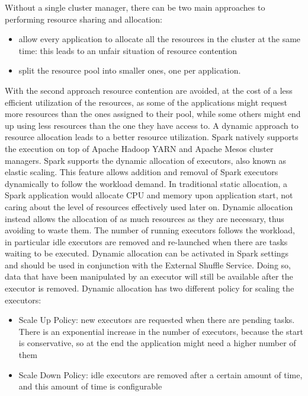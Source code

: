 Without a single cluster manager, there can be two main approaches to performing resource sharing and allocation:
\begin{itemize}
	\item  allow every application to allocate all the resources in the cluster at the same time: this leads to an unfair situation of resource contention
	\item split the resource pool into smaller ones, one per application.
\end{itemize}
With the second approach resource contention are avoided, at the cost of a less efficient utilization of the resources, as some of the applications might request more resources than the ones assigned to their pool, while some others might end up using less resources than the one they have access to.
A dynamic approach to resource allocation leads to a better resource utilization. Spark natively supports the execution on top of Apache Hadoop YARN and Apache Mesos cluster managers.
Spark supports the dynamic allocation of executors, also known as elastic scaling. This feature allows addition and removal of Spark executors dynamically to follow the workload demand.
In traditional static allocation, a Spark application would allocate CPU and memory upon application start, not caring about the level of resources effectively used later on. Dynamic allocation instead allows the allocation of as much resources as they are necessary, thus avoiding to waste them. The number of running executors follows the workload, in particular
idle executors are removed and re-launched when there are tasks waiting 
to be executed. Dynamic allocation can be activated in Spark settings and should be used in conjunction with the External Shuffle Service.  Doing so, data that have been manipulated
by an executor will still be available after the executor is removed. 
Dynamic allocation has two different policy for scaling the executors:
\begin{itemize}
	\item Scale Up Policy: new executors are requested when there are pending tasks. There is an exponential increase in the number of executors, because the start is conservative, so at the end the application might need a higher number of them
	\item Scale Down Policy: idle executors are removed after a certain amount of time, and this amount of time is configurable
\end{itemize}
